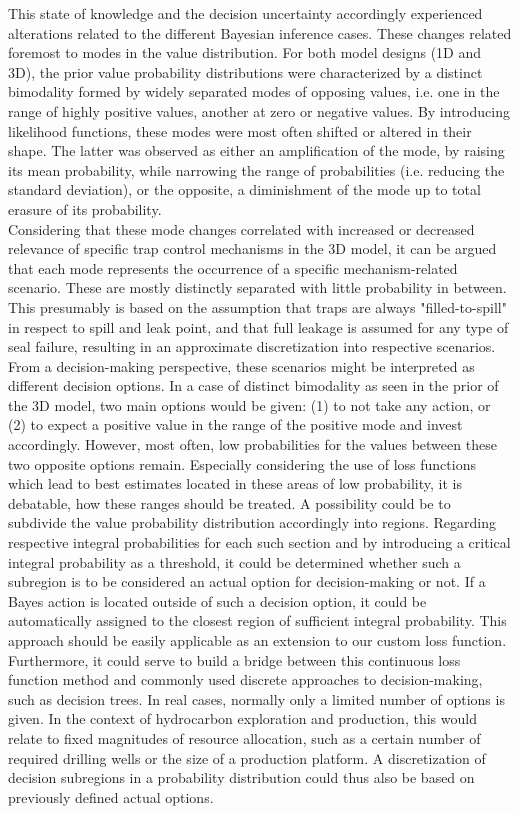 	This state of knowledge and the decision uncertainty accordingly experienced alterations related to the different Bayesian inference cases. These changes related foremost to modes in the value distribution. For both model designs (1D and 3D), the prior value probability distributions were characterized by a distinct bimodality formed by widely separated modes of opposing values, i.e. one in the range of highly positive values, another at zero or negative values. By introducing likelihood functions, these modes were most often shifted or altered in their shape. The latter was observed as either an amplification of the mode, by raising its mean probability, while narrowing the range of probabilities (i.e. reducing the standard deviation), or the opposite, a diminishment of the mode up to total erasure of its probability.\\
	Considering that these mode changes correlated with increased or decreased relevance of specific trap control mechanisms in the 3D model, it can be argued that each mode represents the occurrence of a specific mechanism-related scenario. These are mostly distinctly separated with little probability in between. This presumably is based on the assumption that traps are always "filled-to-spill" in respect to spill and leak point, and that full leakage is assumed for any type of seal failure, resulting in an approximate discretization into respective scenarios.\\
	From a decision-making perspective, these scenarios might be interpreted as different decision options. In a case of distinct bimodality as seen in the prior of the 3D model, two main options would be given: (1) to not take any action, or (2) to expect a positive value in the range of the positive mode and invest accordingly. However, most often, low probabilities for the values between these two opposite options remain. Especially considering the use of loss functions which lead to best estimates located in these areas of low probability, it is debatable, how these ranges should be treated. A possibility could be to subdivide the value probability distribution accordingly into regions. Regarding respective integral probabilities for each such section and by introducing a critical integral probability as a threshold, it could be determined whether such a subregion is to be considered an actual option for decision-making or not. If a Bayes action is located outside of such a decision option, it could be automatically assigned to the closest region of sufficient integral probability. This approach should be easily applicable as an extension to our custom loss function. Furthermore, it could serve to build a bridge between this continuous loss function method and commonly used discrete approaches to decision-making, such as decision trees. In real cases, normally only a limited number of options is given. In the context of hydrocarbon exploration and production, this would relate to fixed magnitudes of resource allocation, such as a certain number of required drilling wells or the size of a production platform. A discretization of decision subregions in a probability distribution could thus also be based on previously defined actual options.\\
	
